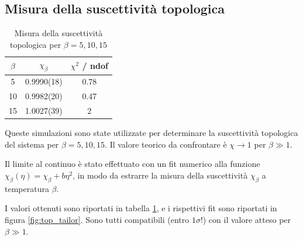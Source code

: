 \documentclass[a4paper,11pt]{article}
\begin{document}
    \subsection{Misura della suscettività topologica}
    
    \begin{table}
        \centering
        \begin{tabular}{c c c} \hline
            $\beta$   & $\chi_\beta$    & $\chi^2$ / ndof \\ \hline
            5      & 0.9990(18)    & 0.78 \\
            10     & 0.9982(20)             & 0.47 \\
            15     & 1.0027(39)             & 2 \\ \hline
            
        \end{tabular} 
        \caption{Misura della suscettività topologica per $\beta = 5, 10, 15$}
        \label{tab:top_tailor}
    \end{table}
    

    Queste simulazioni sono state utilizzate per determinare la suscettività topologica del sistema per $\beta = 5, 10, 15$. Il valore teorico da confrontare è $\chi \to 1$ per $\beta \gg 1$.
    
    Il limite al continuo è stato effettuato con un fit numerico alla funzione $\chi_\beta(\eta) = \chi_\beta + b\eta^2$, in modo da estrarre la misura della suscettività $\chi_\beta$ a temperatura $\beta$.
    
    I valori ottenuti sono riportati in tabella \ref{tab:top_tailor}, e i rispettivi fit sono riportati in figura \ref{fig:top_tailor}. Sono tutti compatibili (entro $1\sigma$!) con il valore atteso per $\beta \gg 1$.
\end{document}
